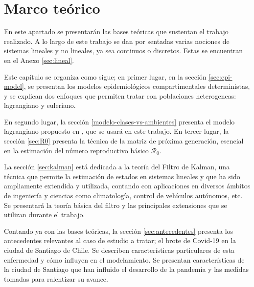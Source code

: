 \chapter{Marco teórico}\label{chap:marco}



En este apartado se presentarán las bases teóricas que sustentan el trabajo realizado. A lo largo de este trabajo se dan por sentadas varias nociones de sistemas lineales y no lineales, ya sea continuos o discretos. Estas se encuentran en el Anexo \ref{sec:lineal}.

Este capítulo se organiza como sigue; en primer lugar, en la sección \ref{sec:epi-model}, se presentan los modelos epidemiológicos compartimentales deterministas, y se explican dos enfoques que permiten tratar con poblaciones heterogeneas: lagrangiano y euleriano. 

En segundo lugar, la sección \ref{modelo-clases-vs-ambientes} presenta el modelo lagrangiano propuesto en \cite{Bichara2015}, que se usará en este trabajo. En tercer lugar, la sección \ref{sec:R0} presenta la técnica de la matriz de próxima generación, esencial en la estimación del número reproductivo básico \(\mathcal{R}_0\).

La sección \ref{sec:kalman} está dedicada a la teoría del Filtro de Kalman, una técnica que permite la estimación de estados en sistemas lineales y que ha sido ampliamente extendida y utilizada, contando con aplicaciones en diversos ámbitos de ingeniería y ciencias como climatología, control de vehículos autónomos, etc. Se presentará la teoría básica del filtro y las principales extensiones que se utilizan durante el trabajo.

Contando ya con las bases teóricas, la sección \ref{sec:antecedentes} presenta los antecedentes relevantes al caso de estudio a tratar; el brote de Covid-19 en la ciudad de Santiago de Chile. Se describen características particulares de esta enfermedad y cómo influyen en el modelamiento. Se presentan características de la ciudad de Santiago que han influido el desarrollo de la pandemia y las medidas tomadas para ralentizar su avance.


